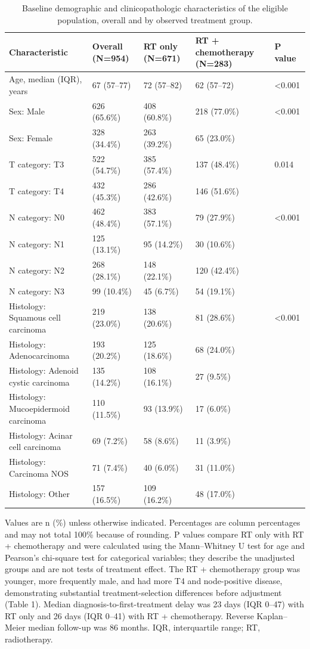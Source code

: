 \documentclass[9pt,twocolumn]{extarticle}
\begin{document}
\begin{table}[t]
\centering
\caption{Baseline demographic and clinicopathologic characteristics of the eligible population, overall and by observed treatment group.}
\scriptsize
\begin{tabularx}{\textwidth}{@{}XXXXX@{}}
\toprule
\textbf{Characteristic} & \textbf{Overall (N=954)} & \textbf{RT only (N=671)} & \textbf{RT + chemotherapy (N=283)} & \textbf{P value} \\
\midrule
Age, median (IQR), years & 67 (57--77) & 72 (57--82) & 62 (57--72) & <0.001 \\
Sex: Male & 626 (65.6\%) & 408 (60.8\%) & 218 (77.0\%) & <0.001 \\
Sex: Female & 328 (34.4\%) & 263 (39.2\%) & 65 (23.0\%) &  \\
T category: T3 & 522 (54.7\%) & 385 (57.4\%) & 137 (48.4\%) & 0.014 \\
T category: T4 & 432 (45.3\%) & 286 (42.6\%) & 146 (51.6\%) &  \\
N category: N0 & 462 (48.4\%) & 383 (57.1\%) & 79 (27.9\%) & <0.001 \\
N category: N1 & 125 (13.1\%) & 95 (14.2\%) & 30 (10.6\%) &  \\
N category: N2 & 268 (28.1\%) & 148 (22.1\%) & 120 (42.4\%) &  \\
N category: N3 & 99 (10.4\%) & 45 (6.7\%) & 54 (19.1\%) &  \\
Histology: Squamous cell carcinoma & 219 (23.0\%) & 138 (20.6\%) & 81 (28.6\%) & <0.001 \\
Histology: Adenocarcinoma & 193 (20.2\%) & 125 (18.6\%) & 68 (24.0\%) &  \\
Histology: Adenoid cystic carcinoma & 135 (14.2\%) & 108 (16.1\%) & 27 (9.5\%) &  \\
Histology: Mucoepidermoid carcinoma & 110 (11.5\%) & 93 (13.9\%) & 17 (6.0\%) &  \\
Histology: Acinar cell carcinoma & 69 (7.2\%) & 58 (8.6\%) & 11 (3.9\%) &  \\
Histology: Carcinoma NOS & 71 (7.4\%) & 40 (6.0\%) & 31 (11.0\%) &  \\
Histology: Other & 157 (16.5\%) & 109 (16.2\%) & 48 (17.0\%) &  \\
\bottomrule
\end{tabularx}
\end{table}
Values are n (\%) unless otherwise indicated. Percentages are column percentages and may not total 100\% because of rounding. P values compare RT only with RT + chemotherapy and were calculated using the Mann--Whitney U test for age and Pearson's chi-square test for categorical variables; they describe the unadjusted groups and are not tests of treatment effect. The RT + chemotherapy group was younger, more frequently male, and had more T4 and node-positive disease, demonstrating substantial treatment-selection differences before adjustment (Table 1). Median diagnosis-to-first-treatment delay was 23 days (IQR 0--47) with RT only and 26 days (IQR 0--41) with RT + chemotherapy. Reverse Kaplan--Meier median follow-up was 86 months. IQR, interquartile range; RT, radiotherapy.\par
\end{document}
